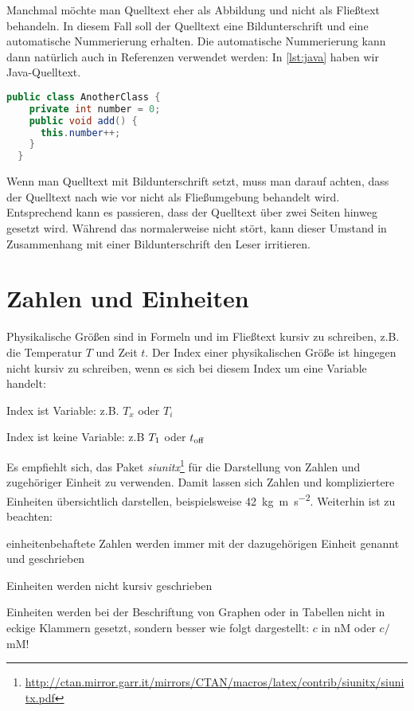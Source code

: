 Manchmal möchte man Quelltext eher als Abbildung und nicht als Fließtext behandeln. In diesem Fall soll der Quelltext eine Bildunterschrift und eine automatische Nummerierung erhalten. Die automatische Nummerierung kann dann natürlich auch in Referenzen verwendet werden: In \vref{lst:java} haben wir Java-Quelltext.

\begin{lstlisting}[language=Java,gobble=2,caption={Ich bin die Bildunterschrift des Quelltextes},label=lst:java]
  public class AnotherClass {
    private int number = 0;
    public void add() {
      this.number++;
    }
  }
\end{lstlisting}

Wenn man Quelltext mit Bildunterschrift setzt, muss man darauf achten, dass der Quelltext nach wie vor nicht als Fließumgebung behandelt wird. Entsprechend kann es passieren, dass der Quelltext über zwei Seiten hinweg gesetzt wird. Während das normalerweise nicht stört, kann dieser Umstand in Zusammenhang mit einer Bildunterschrift den Leser irritieren.

\section{Zahlen und Einheiten}

Physikalische Größen sind in Formeln und im Fließtext kursiv zu schreiben, z.B. die Temperatur $T$ und Zeit $t$. Der Index einer physikalischen Größe ist hingegen nicht kursiv zu schreiben, wenn es sich bei diesem Index um eine Variable handelt:

\begin{compactitem}
	\item Index ist Variable: z.B. $T_x$ oder $T_i$
	\item Index ist keine Variable: z.B $T_{\rm{1}}$ oder $t_{\rm{off}}$
\end{compactitem}

Es empfiehlt sich, das Paket \textit{siunitx}\footnote{\url{http://ctan.mirror.garr.it/mirrors/CTAN/macros/latex/contrib/siunitx/siunitx.pdf}} für die Darstellung von Zahlen und zugehöriger Einheit zu verwenden. Damit lassen sich Zahlen und kompliziertere Einheiten übersichtlich darstellen, beispielsweise \SI{42}{\kilo\gram\metre\per\square\second}. Weiterhin ist zu beachten:

\begin{compactitem}
	\item einheitenbehaftete Zahlen werden immer mit der dazugehörigen Einheit genannt und geschrieben
	\item Einheiten werden nicht kursiv geschrieben
	\item Einheiten werden bei der Beschriftung von Graphen oder in Tabellen nicht in eckige Klammern gesetzt, sondern besser wie folgt dargestellt: $c$ in nM oder $c /$mM!
\end{compactitem}

